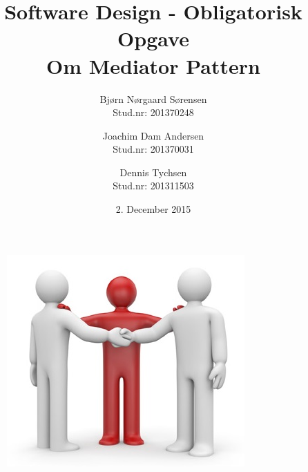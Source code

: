 \title{
	\textbf{Software Design - Obligatorisk Opgave}
	\\ 
	Om Mediator Pattern
}

\date{
	2. December 2015
}

\author{
	Bjørn Nørgaard Sørensen\\
	Stud.nr: 201370248
	\and
	Joachim Dam Andersen\\
	Stud.nr: 201370031
	\and
	Dennis Tychsen\\
	Stud.nr: 201311503
}

\begin{titlepage}
	\maketitle
	\begin{figure}[h]
		\centering
		\includegraphics[width=0.7\linewidth]{figs/mediator}
	\end{figure}

\end{titlepage}
\pagebreak